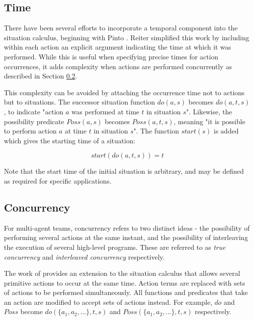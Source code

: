 \documentclass{llncs}
\begin{document}
\subsection{Time}

There have been several efforts to incorporate a temporal component
into the situation calculus, beginning with Pinto \cite{pinto94temporal}.
Reiter \cite{reiter96sc_nat_conc} simplified this work by including
within each action an explicit argument indicating the time at which
it was performed. While this is useful when specifying precise times
for action occurrences, it adds complexity when actions are performed
concurrently as described in Section \ref{sub:Concurrency}.

This complexity can be avoided by attaching the occurrence time not
to actions but to situations. The successor situation function $do(a,s)$
becomes $do(a,t,s)$, to indicate "action $a$ was performed at
time $t$ in situation $s$". Likewise, the possibility predicate
$Poss(a,s)$ becomes $Poss(a,t,s)$, meaning "it is possible to
perform action $a$ at time $t$ in situation $s$". The function
$start(s)$ is added which gives the starting time of a situation:

\[
start(do(a,t,s))=t
\]


Note that the start time of the initial situation is arbitrary, and
may be defined as required for specific applications.


\subsection{Concurrency}

\label{sub:Concurrency}

For multi-agent teams, concurrency refers to two distinct ideas -
the possibility of performing several actions at the same instant,
and the possibility of interleaving the execution of several high-level
programs. These are referred to as \emph{true concurrency} and \emph{interleaved
concurrency} respectively.

The work of \cite{lin92sc_conc,reiter96sc_nat_conc} provides an extension
to the situation calculus that allows several primitive actions to
occur at the same time. Action terms are replaced with sets of actions
to be performed simultaneously. All functions and predicates that
take an action are modified to accept sets of actions instead. For
example, $do$ and $Poss$ become $do(\{ a_{1},a_{2},...\},t,s)$
and $Poss(\{ a_{1},a_{2},...\},t,s)$ respectively.
\end{document}
